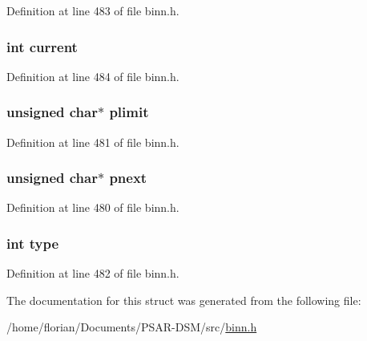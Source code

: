 Definition at line 483 of file binn.\+h.

\subsubsection[{\texorpdfstring{current}{current}}]{\setlength{\rightskip}{0pt plus 5cm}int current}\hypertarget{structbinn__iter__struct_ab04e2d55ea4a544f3575812582af7b51}{}\label{structbinn__iter__struct_ab04e2d55ea4a544f3575812582af7b51}


Definition at line 484 of file binn.\+h.

\subsubsection[{\texorpdfstring{plimit}{plimit}}]{\setlength{\rightskip}{0pt plus 5cm}unsigned char$\ast$ plimit}\hypertarget{structbinn__iter__struct_a156a80ab5f2841c2abc815b1b64f6e41}{}\label{structbinn__iter__struct_a156a80ab5f2841c2abc815b1b64f6e41}


Definition at line 481 of file binn.\+h.

\subsubsection[{\texorpdfstring{pnext}{pnext}}]{\setlength{\rightskip}{0pt plus 5cm}unsigned char$\ast$ pnext}\hypertarget{structbinn__iter__struct_ace82a9e1b92658f5524dbeb5ce77c294}{}\label{structbinn__iter__struct_ace82a9e1b92658f5524dbeb5ce77c294}


Definition at line 480 of file binn.\+h.

\subsubsection[{\texorpdfstring{type}{type}}]{\setlength{\rightskip}{0pt plus 5cm}int type}\hypertarget{structbinn__iter__struct_ac765329451135abec74c45e1897abf26}{}\label{structbinn__iter__struct_ac765329451135abec74c45e1897abf26}


Definition at line 482 of file binn.\+h.



The documentation for this struct was generated from the following file\+:\begin{DoxyCompactItemize}
\item 
/home/florian/\+Documents/\+P\+S\+A\+R-\/\+D\+S\+M/src/\hyperlink{binn_8h}{binn.\+h}\end{DoxyCompactItemize}
